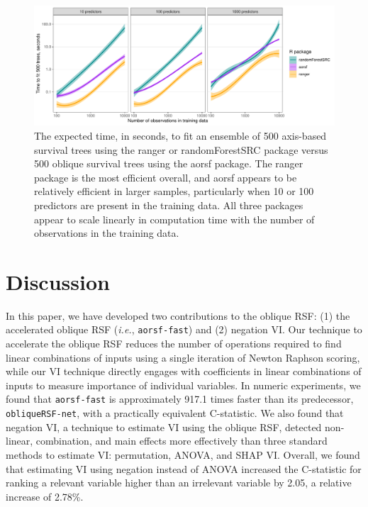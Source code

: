 \documentclass[12pt]{article}\usepackage[]{graphicx}\usepackage[]{xcolor}
\makeatletter
\def\maxwidth{ %
  \ifdim\Gin@nat@width>\linewidth
    \linewidth
  \else
    \Gin@nat@width
  \fi
}
\newenvironment{knitrout}{}{} %
\newcommand{\ie}{\textit{i.e.}}
\makeatother
\begin{document}
\begin{knitrout}
\color{fgcolor}\begin{figure}
\includegraphics[width=\maxwidth]{figure/bm_time_viz-1} \caption[The expected time, in seconds, to fit an ensemble of 500 axis-based survival trees using the ranger or randomForestSRC package versus 500 oblique survival trees using the aorsf package]{The expected time, in seconds, to fit an ensemble of 500 axis-based survival trees using the ranger or randomForestSRC package versus 500 oblique survival trees using the aorsf package. The ranger package is the most efficient overall, and aorsf appears to be relatively efficient in larger samples, particularly when 10 or 100 predictors are present in the training data. All three packages appear to scale linearly in computation time with the number of observations in the training data.}\label{fig:bm_time_viz}
\end{figure}

\end{knitrout}


\section{Discussion} \label{sec:discussion}

In this paper, we have developed two contributions to the oblique RSF: (1) the accelerated oblique RSF (\ie, \texttt{aorsf-fast}) and (2) negation VI. Our technique to accelerate the oblique RSF reduces the number of operations required to find linear combinations of inputs using a single iteration of Newton Raphson scoring, while our VI technique directly engages with coefficients in linear combinations of inputs to measure importance of individual variables. In numeric experiments, we found that \texttt{aorsf-fast} is approximately 917.1 times faster than its predecessor, \texttt{obliqueRSF-net}, with a practically equivalent C-statistic. We also found that negation VI, a technique to estimate VI using the oblique RSF, detected non-linear, combination, and main effects more effectively than three standard methods to estimate VI: permutation, ANOVA, and SHAP VI. Overall, we found that estimating VI using negation instead of ANOVA increased the C-statistic for ranking a relevant variable higher than an irrelevant variable by 2.05, a relative increase of 2.78\%.
\end{document}
